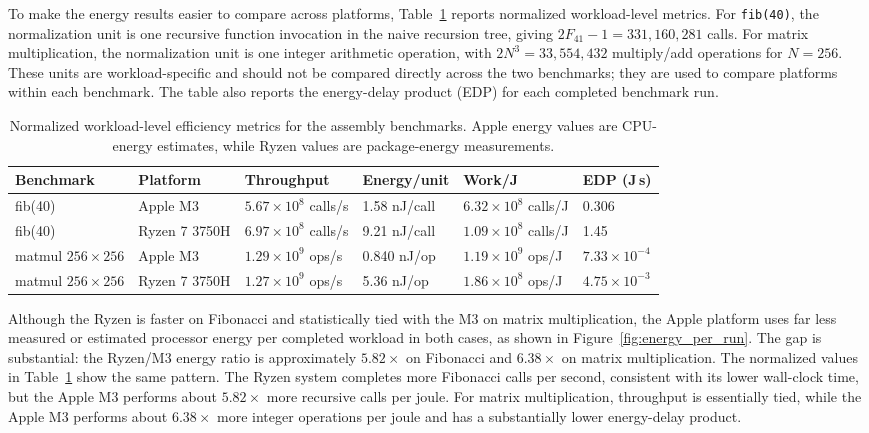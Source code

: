 \documentclass{tcsa}
\begin{document}
To make the energy results easier to compare across platforms,
Table~\ref{tab:normalized_efficiency} reports normalized workload-level
metrics. For \texttt{fib(40)}, the normalization unit is one recursive
function invocation in the naive recursion tree, giving
$2F_{41}-1 = 331{,}160{,}281$ calls. For matrix multiplication, the
normalization unit is one integer arithmetic operation, with
$2N^3 = 33{,}554{,}432$ multiply/add operations for $N=256$. These
units are workload-specific and should not be compared directly across
the two benchmarks; they are used to compare platforms within each
benchmark. The table also reports the energy-delay product (EDP) for
each completed benchmark run.

\begin{table}[!ht]
\centering
\small
\caption{Normalized workload-level efficiency metrics for the assembly benchmarks. Apple energy values are CPU-energy estimates, while Ryzen values are package-energy measurements.}
\label{tab:normalized_efficiency}
\begin{tabularx}{\textwidth}{llXXXX}
\toprule
Benchmark & Platform & Throughput & Energy/unit & Work/J & EDP (J\,s) \\
\midrule
fib(40) & Apple M3 & $5.67 \times 10^8$ calls/s & 1.58 nJ/call & $6.32 \times 10^8$ calls/J & 0.306 \\
fib(40) & Ryzen 7 3750H & $6.97 \times 10^8$ calls/s & 9.21 nJ/call & $1.09 \times 10^8$ calls/J & 1.45 \\
matmul $256\times256$ & Apple M3 & $1.29 \times 10^9$ ops/s & 0.840 nJ/op & $1.19 \times 10^9$ ops/J & $7.33 \times 10^{-4}$ \\
matmul $256\times256$ & Ryzen 7 3750H & $1.27 \times 10^9$ ops/s & 5.36 nJ/op & $1.86 \times 10^8$ ops/J & $4.75 \times 10^{-3}$ \\
\bottomrule
\end{tabularx}
\end{table}

Although the Ryzen is faster on Fibonacci and statistically tied with
the M3 on matrix multiplication, the Apple platform uses far less
measured or estimated processor energy per completed workload in both
cases, as shown in Figure~\ref{fig:energy_per_run}. The gap is
substantial: the Ryzen/M3 energy ratio is approximately $5.82\times$
on Fibonacci and $6.38\times$ on matrix multiplication.
The normalized values in Table~\ref{tab:normalized_efficiency} show the
same pattern. The Ryzen system completes more Fibonacci calls per
second, consistent with its lower wall-clock time, but the Apple M3
performs about $5.82\times$ more recursive calls per joule. For matrix
multiplication, throughput is essentially tied, while the Apple M3
performs about $6.38\times$ more integer operations per joule and has a
substantially lower energy-delay product.
\end{document}

